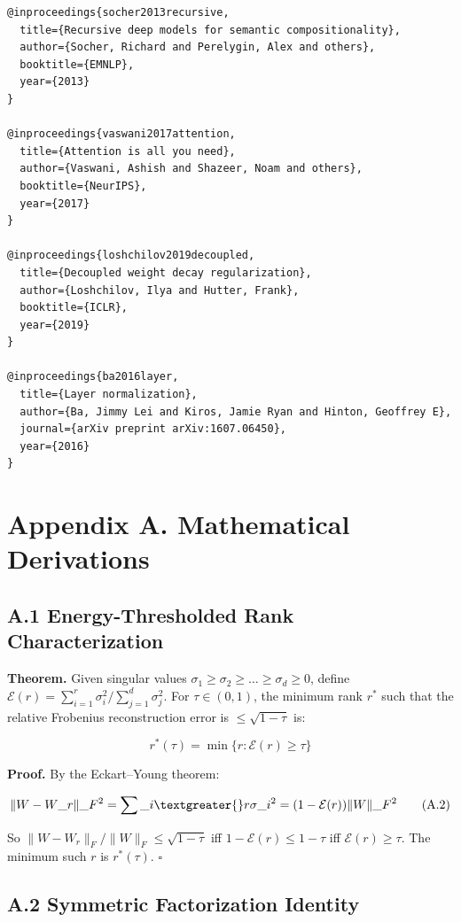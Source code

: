\begin{lstlisting}
@inproceedings{socher2013recursive,
  title={Recursive deep models for semantic compositionality},
  author={Socher, Richard and Perelygin, Alex and others},
  booktitle={EMNLP},
  year={2013}
}

@inproceedings{vaswani2017attention,
  title={Attention is all you need},
  author={Vaswani, Ashish and Shazeer, Noam and others},
  booktitle={NeurIPS},
  year={2017}
}

@inproceedings{loshchilov2019decoupled,
  title={Decoupled weight decay regularization},
  author={Loshchilov, Ilya and Hutter, Frank},
  booktitle={ICLR},
  year={2019}
}

@inproceedings{ba2016layer,
  title={Layer normalization},
  author={Ba, Jimmy Lei and Kiros, Jamie Ryan and Hinton, Geoffrey E},
  journal={arXiv preprint arXiv:1607.06450},
  year={2016}
}
\end{lstlisting}


\section{Appendix A. Mathematical Derivations}

\subsection{A.1 Energy-Thresholded Rank Characterization}

\textbf{Theorem.} Given singular values $\sigma_1 \geq \sigma_2 \geq \dots \geq \sigma_d \geq 0$, 
define $\mathcal{E}(r) = \sum_{i=1}^r \sigma_i^2 / \sum_{j=1}^d \sigma_j^2$. For 
$\tau \in (0, 1)$, the minimum rank $r^*$ such that the relative Frobenius 
reconstruction error is $\leq \sqrt{1 - \tau}$ is:

\[
r^*(\tau) = \min\{r : \mathcal{E}(r) \geq \tau\}
\tag{A.1}
\]

\textbf{Proof.} By the Eckart--Young theorem:

\[
\|W - W\_r\|\_F^2 = \sum\_{i \textgreater{} r} \sigma\_i^2 = (1 - \mathcal{E}(r)) \|W\|\_F^2
\tag{A.2}
\]

So $\|W - W_r\|_F / \|W\|_F \leq \sqrt{1 - \tau}$ iff $1 - \mathcal{E}(r) \leq 1 - \tau$ 
iff $\mathcal{E}(r) \geq \tau$. The minimum such $r$ is $r^*(\tau)$. $\square$

\subsection{A.2 Symmetric Factorization Identity}

